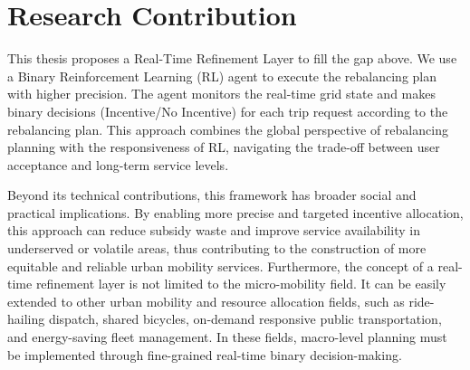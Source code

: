 


\section{Research Contribution}
This thesis proposes a Real-Time Refinement Layer to fill the gap above. We use a Binary Reinforcement Learning (RL) agent to execute the rebalancing plan with higher precision. The agent monitors the real-time grid state and makes binary decisions (Incentive/No Incentive) for each trip request according to the rebalancing plan. This approach combines the global perspective of rebalancing planning with the responsiveness of RL, navigating the trade-off between user acceptance and long-term service levels.

Beyond its technical contributions, this framework has broader social and practical implications. By enabling more precise and targeted incentive allocation, this approach can reduce subsidy waste and improve service availability in underserved or volatile areas, thus contributing to the construction of more equitable and reliable urban mobility services. Furthermore, the concept of a real-time refinement layer is not limited to the micro-mobility field. It can be easily extended to other urban mobility and resource allocation fields, such as ride-hailing dispatch, shared bicycles, on-demand responsive public transportation, and energy-saving fleet management. In these fields, macro-level planning must be implemented through fine-grained real-time binary decision-making.

